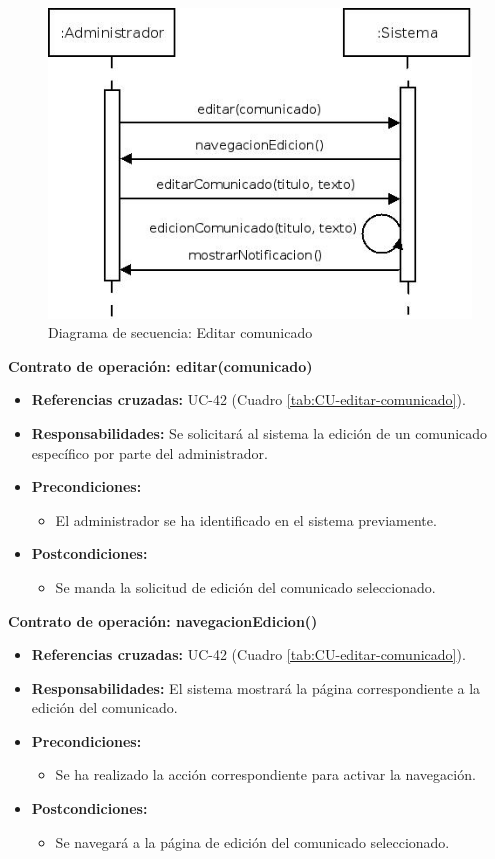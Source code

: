 \begin{figure}[H]
\centering
  \includegraphics[scale=.55]{img/secuencias/editar-comunicado.jpeg}
  \caption{Diagrama de secuencia: Editar comunicado}
  \label{fig:secuencia-editar-comunicado}
\end{figure}

\textbf{Contrato de operación: editar(comunicado)}
\begin{itemize}
\item \textbf{Referencias cruzadas:} UC-42 (Cuadro \ref{tab:CU-editar-comunicado}).
\item \textbf{Responsabilidades:} Se solicitará al sistema la edición de un comunicado específico por parte del administrador.
\item \textbf{Precondiciones:} 
 \begin{itemize}
\item El administrador se ha identificado en el sistema previamente.
\end {itemize}
\item \textbf{Postcondiciones:} 
 \begin{itemize}
\item Se manda la solicitud de edición del comunicado seleccionado.
\end {itemize}
\end {itemize}

\textbf{Contrato de operación: navegacionEdicion()}
\begin{itemize}
\item \textbf{Referencias cruzadas:} UC-42 (Cuadro \ref{tab:CU-editar-comunicado}).
\item \textbf{Responsabilidades:} El sistema mostrará la página correspondiente a la edición del comunicado.
\item \textbf{Precondiciones:} 
 \begin{itemize}
\item Se ha realizado la acción correspondiente para activar la navegación.
\end {itemize}
\item \textbf{Postcondiciones:} 
 \begin{itemize}
\item Se navegará a la página de edición del comunicado seleccionado.
\end {itemize}
\end {itemize}

